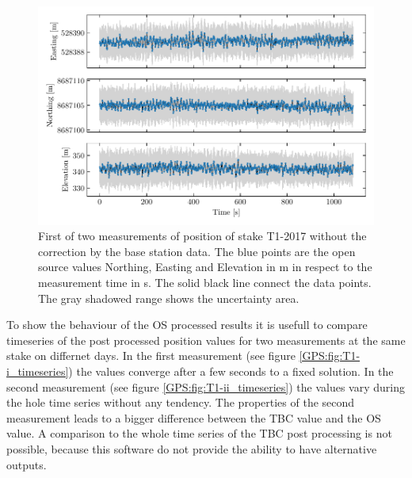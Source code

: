 \begin{figure}[H]
    \centering
    \includegraphics[width=\textwidth]{./figs/timeseries/46250700_org-T1-i-2017_Timeseries-east-north-elev.pdf}
    \caption{First of two measurements of position of stake T1-2017 without the correction by the base station data. The blue points are the open source values Northing, Easting and Elevation in m in respect to the measurement time in s. The solid black line connect the data points. The gray shadowed range shows the uncertainty area.}
    \label{GPS:fig:T1-i_nocorr}
\end{figure}

To show the behaviour of the OS processed results it is usefull to compare timeseries of the post processed position values for two measurements at the same stake on differnet days.
In the first measurement (see figure \ref{GPS:fig:T1-i_timeseries}) the values converge after a few seconds to a fixed solution.
In the second measurement (see figure \ref{GPS:fig:T1-ii_timeseries}) the values vary during the hole time series without any tendency.
The properties of the second measurement leads to a bigger difference between the TBC value and the OS value.
A comparison to the whole time series of the TBC post processing is not possible, because this software do not provide the ability to have alternative outputs.

